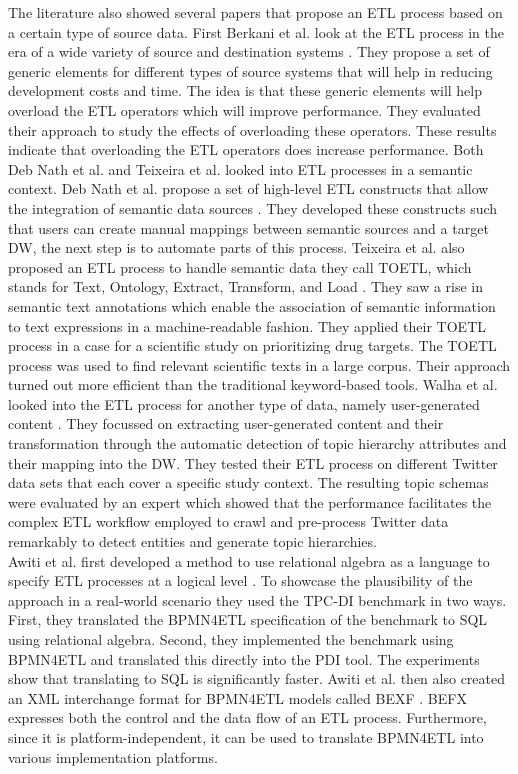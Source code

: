 \documentclass[11pt]{article}
\begin{document}
The literature also showed several papers that propose an ETL process based on a certain type of source data. First Berkani et al. look at the ETL process in the era of a wide variety of source and destination systems \cite{Berkani201898}. They propose a set of generic elements for different types of source systems that will help in reducing development costs and time. The idea is that these generic elements will help overload the ETL operators which will improve performance. They evaluated their approach to study the effects of overloading these operators. These results indicate that overloading the ETL operators does increase performance. Both Deb Nath et al. and Teixeira et al. looked into ETL processes in a semantic context. Deb Nath et al. propose a set of high-level ETL constructs that allow the integration of semantic data sources \cite{DebNath202185}. They developed these constructs such that users can create manual mappings between semantic sources and a target DW, the next step is to automate parts of this process. Teixeira et al. also proposed an ETL process to handle semantic data they call TOETL, which stands for Text, Ontology, Extract, Transform, and Load \cite{Teixeira2018225}. They saw a rise in semantic text annotations which enable the association of semantic information to text expressions in a machine-readable fashion. They applied their TOETL process in a case for a scientific study on prioritizing drug targets. The TOETL process was used to find relevant scientific texts in a large corpus. Their approach turned out more efficient than the traditional keyword-based tools. Walha et al. looked into the ETL process for another type of data, namely user-generated content \cite{Walha2021374}. They focussed on extracting user-generated content and their transformation through the automatic detection of topic hierarchy attributes and their mapping into the DW. They tested their ETL process on different Twitter data sets that each cover a specific study context. The resulting topic schemas were evaluated by an expert which showed that the performance facilitates the complex ETL workflow employed to crawl and pre-process Twitter data remarkably to detect entities and generate topic hierarchies. \\

Awiti et al. first developed a method to use relational algebra as a language to specify ETL processes at a logical level \cite{Awiti2019299}. To showcase the plausibility of the approach in a real-world scenario they used the TPC-DI benchmark in two ways. First, they translated the BPMN4ETL specification of the benchmark to SQL using relational algebra. Second, they implemented the benchmark using BPMN4ETL and translated this directly into the PDI tool. The experiments show that translating to SQL is significantly faster. Awiti et al. then also created an XML interchange format for BPMN4ETL models called BEXF \cite{Awiti2019427}. BEFX expresses both the control and the data flow of an ETL process. Furthermore, since it is platform-independent, it can be used to translate BPMN4ETL into various implementation platforms. \\
\end{document}
